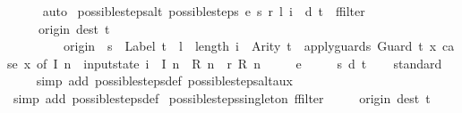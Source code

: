 \begin{isabellebody}
\ \ \ \ \isamarkupfalse%
\ auto\isanewline
{}\isamarkupfalse%
%
\endisatagproof
{\isafoldproof}%
%
\isadelimproof
\isanewline
%
\endisadelimproof
\isanewline
{}\isamarkupfalse%
\ possible{\isacharunderscore}steps{\isacharunderscore}alt{\isacharcolon}\ {\isachardoublequoteopen}{\isacharparenleft}possible{\isacharunderscore}steps\ e\ s\ r\ l\ i\ {\isacharequal}\ {\isacharbraceleft}{\isacharbar}{\isacharparenleft}d{\isacharcomma}\ t{\isacharparenright}{\isacharbar}{\isacharbraceright}{\isacharparenright}\ {\isacharequal}\ {\isacharparenleft}ffilter\isanewline
\ \ \ \ \ {\isacharparenleft}{\isasymlambda}{\isacharparenleft}{\isacharparenleft}origin{\isacharcomma}\ dest{\isacharparenright}{\isacharcomma}\ t{\isacharparenright}{\isachardot}\isanewline
\ \ \ \ \ \ \ \ \ origin\ {\isacharequal}\ s\ {\isasymand}\ Label\ t\ {\isacharequal}\ l\ {\isasymand}\ length\ i\ {\isacharequal}\ Arity\ t\ {\isasymand}\ apply{\isacharunderscore}guards\ {\isacharparenleft}Guard\ t{\isacharparenright}\ {\isacharparenleft}{\isasymlambda}x{\isachardot}\ case\ x\ of\ I\ n\ {\isasymRightarrow}\ input{}state\ i\ {}\ {\isacharparenleft}I\ n{\isacharparenright}\ {\isacharbar}\ R\ n\ {\isasymRightarrow}\ r\ {\isacharparenleft}R\ n{\isacharparenright}{\isacharparenright}{\isacharparenright}\isanewline
\ \ \ \ \ e\ {\isacharequal}\isanewline
\ \ \ \ {\isacharbraceleft}{\isacharbar}{\isacharparenleft}{\isacharparenleft}s{\isacharcomma}\ d{\isacharparenright}{\isacharcomma}\ t{\isacharparenright}{\isacharbar}{\isacharbraceright}{\isacharparenright}{\isachardoublequoteclose}\isanewline
%
\isadelimproof
\ \ %
\endisadelimproof
%
\isatagproof
{}\isamarkupfalse%
\ standard\isanewline
\ \ \ \isamarkupfalse%
\ {\isacharparenleft}simp\ add{\isacharcolon}\ possible{\isacharunderscore}steps{\isacharunderscore}def\ possible{\isacharunderscore}steps{\isacharunderscore}alt{\isacharunderscore}aux{\isacharparenright}\isanewline
\ \ \isamarkupfalse%
\ {\isacharparenleft}simp\ add{\isacharcolon}\ possible{\isacharunderscore}steps{\isacharunderscore}def{\isacharparenright}%
\endisatagproof
{\isafoldproof}%
%
\isadelimproof
\isanewline
%
\endisadelimproof
\isanewline
{}\isamarkupfalse%
\ possible{\isacharunderscore}steps{\isacharunderscore}singleton{\isacharcolon}\ {\isachardoublequoteopen}{\isacharparenleft}ffilter\isanewline
\ \ \ \ \ {\isacharparenleft}{\isasymlambda}{\isacharparenleft}{\isacharparenleft}origin{\isacharcomma}\ dest{\isacharparenright}{\isacharcomma}\ t{\isacharparenright}{\isachardot}\isanewline

\end{isabellebody}
